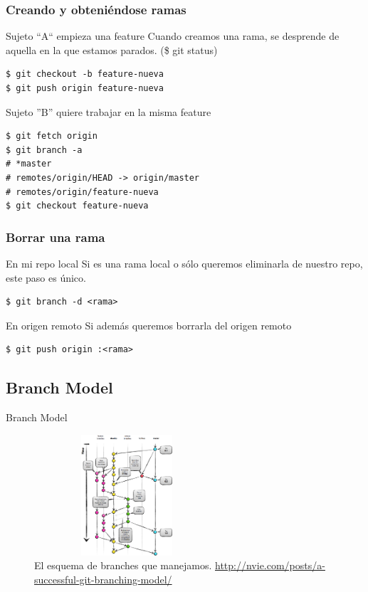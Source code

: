 \documentclass{beamer}
\begin{document}
\begin{frame}[fragile]\frametitle{Creando y obteniéndose ramas}

    \begin{block}{Sujeto ``A`` empieza una feature}
      Cuando creamos una rama, se desprende de aquella en la que estamos parados. (\$ git status)
      \begin{verbatim}
$ git checkout -b feature-nueva
$ git push origin feature-nueva
      \end{verbatim}
    \end{block} \pause
    
    \begin{block}{Sujeto ''B'' quiere trabajar en la misma feature}
      \begin{verbatim}
$ git fetch origin
$ git branch -a
# *master
# remotes/origin/HEAD -> origin/master
# remotes/origin/feature-nueva
$ git checkout feature-nueva
      \end{verbatim}
    \end{block}
  
\end{frame}

\begin{frame}[fragile]\frametitle{Borrar una rama}

    \begin{block}{En mi repo local}
      Si es una rama local o sólo queremos eliminarla de nuestro repo, este paso es único.
      \begin{verbatim}
$ git branch -d <rama>
      \end{verbatim}
    \end{block} \pause
    
    \begin{block}{En origen remoto}
      Si además queremos borrarla del origen remoto
      \begin{verbatim}
$ git push origin :<rama>
      \end{verbatim}
    \end{block}
  
\end{frame}

\subsection{Branch Model}

\begin{frame}{Branch Model}
   \begin{figure}
    \includegraphics[height=170px, width=260px]{branch-model.png} 
    \caption{El esquema de branches que manejamos. \url{http://nvie.com/posts/a-successful-git-branching-model/}}
  \end{figure}
\end{frame}
\end{document}
